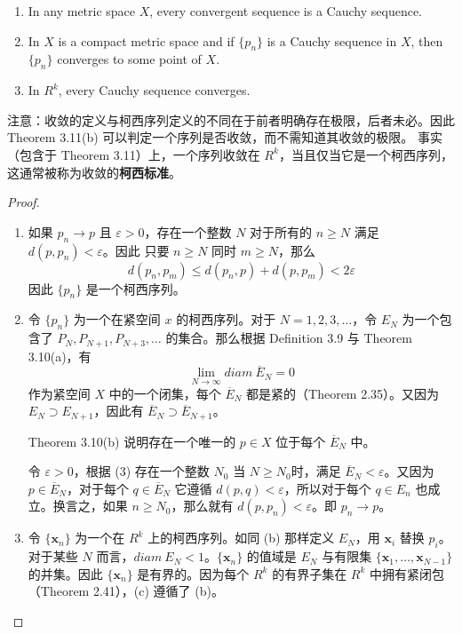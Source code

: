 \documentclass[../poma-notes.tex]{subfiles}
\begin{document}
\begin{theorem}\mbox{}
  \begin{enumerate}
    \item In any metric space $X$, every convergent sequence is a Cauchy sequence.
    \item In $X$ is a compact metric space and if $\{p_n\}$ is a Cauchy sequence in $X$, then $\{p_n\}$ converges to
          some point of $X$.
    \item In $R^k$, every Cauchy sequence converges.
  \end{enumerate}
\end{theorem}

注意：收敛的定义与柯西序列定义的不同在于前者明确存在极限，后者未必。因此 Theorem 3.11(b) 可以判定一个序列是否收敛，而不需知道其收敛的极限。
事实（包含于 Theorem 3.11）上，一个序列收敛在 $R^k$，当且仅当它是一个柯西序列，这通常被称为收敛的\textbf{柯西标准}。

\begin{proof}
  \begin{enumerate}[label=(\alph*)]
    \item 如果 $p_n \to p$ 且 $\varepsilon > 0$，存在一个整数 $N$ 对于所有的 $n \ge N$ 满足 $d(p,p_n) < \varepsilon$。因此
          只要 $n \ge N$ 同时 $m \ge N$，那么
          \[ d(p_n, p_m) \le d(p_n, p) + d(p, p_m) < 2\varepsilon \]
          因此 $\{p_n\}$ 是一个柯西序列。
    \item 令 $\{p_n\}$ 为一个在紧空间 $x$ 的柯西序列。对于 $N=1,2,3,\dots$，令 $E_N$ 为一个包含了 $P_N,P_{N+1},P_{N+3},\dots$
          的集合。那么根据 Definition 3.9 与 Theorem 3.10(a)，有
          \begin{equation}
            \lim_{N \to \infty} diam\ \overline{E}_N = 0
          \end{equation}
          作为紧空间 $X$ 中的一个闭集，每个 $\overline{E}_N$ 都是紧的（Theorem 2.35）。又因为 $E_N \supset E_{N+1}$，因此有
          $\overline{E}_N \supset \overline{E}_{N+1}$。

          Theorem 3.10(b) 说明存在一个唯一的 $p \in X$ 位于每个 $\overline{E}_N$ 中。

          令 $\varepsilon > 0$，根据 (3) 存在一个整数 $N_0$ 当 $N \ge N_0$时，满足 $\overline{E}_N < \varepsilon$。又因为
          $p \in \overline{E}_N$，对于每个 $q \in \overline{E}_N$ 它遵循 $d(p,q) < \varepsilon$，所以对于每个 $q \in E_n$
          也成立。换言之，如果 $n \ge N_0$，那么就有 $d(p,p_n)<\varepsilon$。即 $p_n \to p$。
    \item 令 $\{\mathbf{x}_n\}$ 为一个在 $R^k$ 上的柯西序列。如同 (b) 那样定义 $E_N$，用 $\mathbf{x}_i$ 替换 $p_i$。对于某些
          $N$ 而言，$diam\ E_N<1$。$\{\mathbf{x}_n\}$ 的值域是 $E_N$ 与有限集 $\{\mathbf{x}_1,\dots,\mathbf{x}_{N-1}\}$
          的并集。因此 $\{\mathbf{x}_n\}$ 是有界的。因为每个 $R^k$ 的有界子集在 $R^k$ 中拥有紧闭包（Theorem 2.41），(c) 遵循了
          (b)。
  \end{enumerate}
\end{proof}
\end{document}
